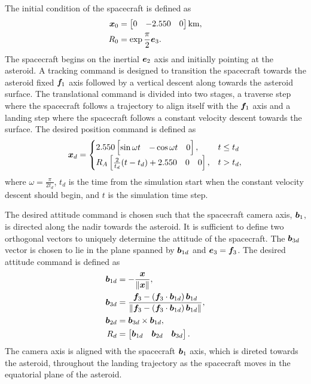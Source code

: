 The initial condition of the spacecraft is defined as
\begin{align}
    \bm{x}_0 &= \begin{bmatrix} 0 & -2.550 & 0 \end{bmatrix} \si{\kilo\meter}, \\
    R_0 &= \exp {\frac{\pi}{2} \bm{e}_3}.
\end{align}
The spacecraft begins on the inertial \( \bm{e}_2 \) axis and initially pointing at the asteroid. 
A tracking command is designed to transition the spacecraft towards the asteroid fixed \( \bm{f}_1  \) axis followed by a vertical descent along towards the asteroid surface.
The translational command is divided into two stages, a traverse step where the spacecraft follows a trajectory to align itself with the \( \bm{f}_1 \) axis and a landing step where the spacecraft follows a constant velocity descent towards the surface. 
The desired position command is defined as
\begin{align}
    \bm{x}_d = 
    \begin{cases}
        2.550 \begin{bmatrix} \sin{\omega t} & -\cos{\omega t} & 0 \end{bmatrix}, & t \leq t_d \\
        R_A \begin{bmatrix} \frac{2}{t_d} (t - t_d) + 2.550 & 0 & 0 \end{bmatrix}, & t > t_d , 
    \end{cases}
\end{align}
where \( \omega = \frac{\pi}{2 t_d} \), \( t_d \) is the time from the simulation start when the constant velocity descent should begin, and \( t \) is the simulation time step.

The desired attitude command is chosen such that the spacecraft camera axis, \( \bm{b}_1 \), is directed along the nadir towards the asteroid.
It is sufficient to define two orthogonal vectors to uniquely determine the attitude of the spacecraft.
The \( \bm{b}_{3d} \) vector is chosen to lie in the plane spanned by \(\bm{b}_{1d} \) and \( \bm{e}_3 = \bm{f}_3 \).
The desired attitude command is defined as
\begin{align}
    \bm{b}_{1d} &= - \frac{\bm{x}}{\left\| \bm{x} \right\|} , \\
    \bm{b}_{3d} &= \frac{\bm{f}_3 - \left( \bm{f}_3 \cdot \bm{b}_{1d} \right) \bm{b}_{1d}}{\left\| \bm{f}_3 - \left( \bm{f}_3 \cdot \bm{b}_{1d} \right) \bm{b}_{1d} \right\|}, \\
    \bm{b}_{2d} &= \bm{b}_{3d} \times \bm{b}_{1d} , \\
R_d &= \begin{bmatrix} \bm{b}_{1d} & \bm{b}_{2d} & \bm{b}_{3d} \end{bmatrix}.
\end{align}
The camera axis is aligned with the spacecraft \( \bm{b}_ 1 \) axis, which is direted towards the asteroid, throughout the landing trajectory as the spacecraft moves in the equatorial plane of the asteroid.

